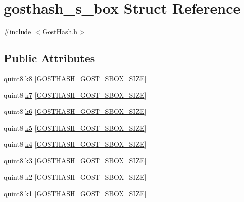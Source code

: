\hypertarget{structgosthash__s__box}{}\section{gosthash\+\_\+s\+\_\+box Struct Reference}
\label{structgosthash__s__box}


{\ttfamily \#include $<$Gost\+Hash.\+h$>$}

\subsection*{Public Attributes}
\begin{DoxyCompactItemize}
\item 
quint8 \hyperlink{structgosthash__s__box_a3336ba3e62d3def6425be698a18e8f3b}{k8} \mbox{[}\hyperlink{_gost_hash_8h_af1180f1c3243bbce8ea02985c5f44bfe}{G\+O\+S\+T\+H\+A\+S\+H\+\_\+\+G\+O\+S\+T\+\_\+\+S\+B\+O\+X\+\_\+\+S\+I\+ZE}\mbox{]}
\item 
quint8 \hyperlink{structgosthash__s__box_ab4af14cab85aee9c073f82237dfcd451}{k7} \mbox{[}\hyperlink{_gost_hash_8h_af1180f1c3243bbce8ea02985c5f44bfe}{G\+O\+S\+T\+H\+A\+S\+H\+\_\+\+G\+O\+S\+T\+\_\+\+S\+B\+O\+X\+\_\+\+S\+I\+ZE}\mbox{]}
\item 
quint8 \hyperlink{structgosthash__s__box_a50201229bf8e363da3c6eae9fc9bbf24}{k6} \mbox{[}\hyperlink{_gost_hash_8h_af1180f1c3243bbce8ea02985c5f44bfe}{G\+O\+S\+T\+H\+A\+S\+H\+\_\+\+G\+O\+S\+T\+\_\+\+S\+B\+O\+X\+\_\+\+S\+I\+ZE}\mbox{]}
\item 
quint8 \hyperlink{structgosthash__s__box_a136843f275f13620ff7b2274c0122f7f}{k5} \mbox{[}\hyperlink{_gost_hash_8h_af1180f1c3243bbce8ea02985c5f44bfe}{G\+O\+S\+T\+H\+A\+S\+H\+\_\+\+G\+O\+S\+T\+\_\+\+S\+B\+O\+X\+\_\+\+S\+I\+ZE}\mbox{]}
\item 
quint8 \hyperlink{structgosthash__s__box_a473e4be37f837c33f3e3d4d9f06ce7c5}{k4} \mbox{[}\hyperlink{_gost_hash_8h_af1180f1c3243bbce8ea02985c5f44bfe}{G\+O\+S\+T\+H\+A\+S\+H\+\_\+\+G\+O\+S\+T\+\_\+\+S\+B\+O\+X\+\_\+\+S\+I\+ZE}\mbox{]}
\item 
quint8 \hyperlink{structgosthash__s__box_ad86621e37938b50e69fb7afad9a57853}{k3} \mbox{[}\hyperlink{_gost_hash_8h_af1180f1c3243bbce8ea02985c5f44bfe}{G\+O\+S\+T\+H\+A\+S\+H\+\_\+\+G\+O\+S\+T\+\_\+\+S\+B\+O\+X\+\_\+\+S\+I\+ZE}\mbox{]}
\item 
quint8 \hyperlink{structgosthash__s__box_aa943d4e5af73f7e2d32354659baea32d}{k2} \mbox{[}\hyperlink{_gost_hash_8h_af1180f1c3243bbce8ea02985c5f44bfe}{G\+O\+S\+T\+H\+A\+S\+H\+\_\+\+G\+O\+S\+T\+\_\+\+S\+B\+O\+X\+\_\+\+S\+I\+ZE}\mbox{]}
\item 
quint8 \hyperlink{structgosthash__s__box_a4aee6188ea7631d2634af63e1f5e4afd}{k1} \mbox{[}\hyperlink{_gost_hash_8h_af1180f1c3243bbce8ea02985c5f44bfe}{G\+O\+S\+T\+H\+A\+S\+H\+\_\+\+G\+O\+S\+T\+\_\+\+S\+B\+O\+X\+\_\+\+S\+I\+ZE}\mbox{]}
\end{DoxyCompactItemize}


